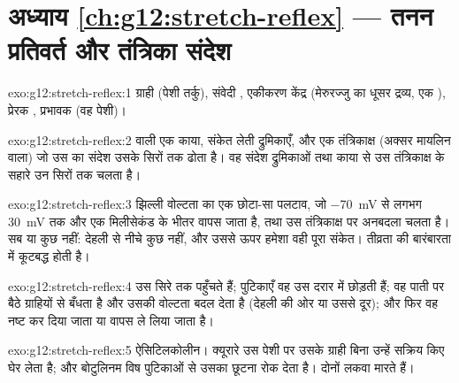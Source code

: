 \section*{अध्याय \ref{ch:g12:stretch-reflex} --- तनन प्रतिवर्त और तंत्रिका संदेश}

\begin{solution}{exo:g12:stretch-reflex:1}
ग्राही (पेशी तर्कु), संवेदी , एकीकरण केंद्र (मेरुरज्जु का धूसर
द्रव्य, एक ), प्रेरक , प्रभावक (वह पेशी)।
\end{solution}

\begin{solution}{exo:g12:stretch-reflex:2}
 वाली एक  काया, संकेत लेती द्रुमिकाएँ, और एक तंत्रिकाक्ष
(अक्सर मायलिन वाला) जो उस  का संदेश उसके सिरों तक ढोता है। वह संदेश
द्रुमिकाओं तथा  काया से उस तंत्रिकाक्ष के सहारे उन सिरों तक चलता है।
\end{solution}

\begin{solution}{exo:g12:stretch-reflex:3}
झिल्ली वोल्टता का एक छोटा-सा पलटाव, जो \qty{-70}{mV} से लगभग
\qty{+30}{mV} तक और एक मिलीसेकंड के भीतर वापस जाता है, तथा उस तंत्रिकाक्ष पर
अनबदला चलता है। सब या कुछ नहीं: देहली से नीचे कुछ नहीं, और उससे ऊपर हमेशा वही
पूरा संकेत। तीव्रता  की बारंबारता में कूटबद्ध होती है।
\end{solution}

\begin{solution}{exo:g12:stretch-reflex:4}
 उस सिरे तक पहुँचते हैं; पुटिकाएँ वह  उस दरार में
छोड़ती हैं; वह पाती  पर बैठे ग्राहियों से बँधता है और उसकी वोल्टता
बदल देता है (देहली की ओर या उससे दूर); और फिर वह नष्ट कर दिया जाता या वापस
ले लिया जाता है।
\end{solution}

\begin{solution}{exo:g12:stretch-reflex:5}
ऐसिटिलकोलीन। क्यूरारे उस पेशी पर उसके ग्राही बिना उन्हें सक्रिय किए घेर
लेता है; और बोटुलिनम विष पुटिकाओं से उसका छूटना रोक देता है। दोनों लकवा
मारते हैं।
\end{solution}

